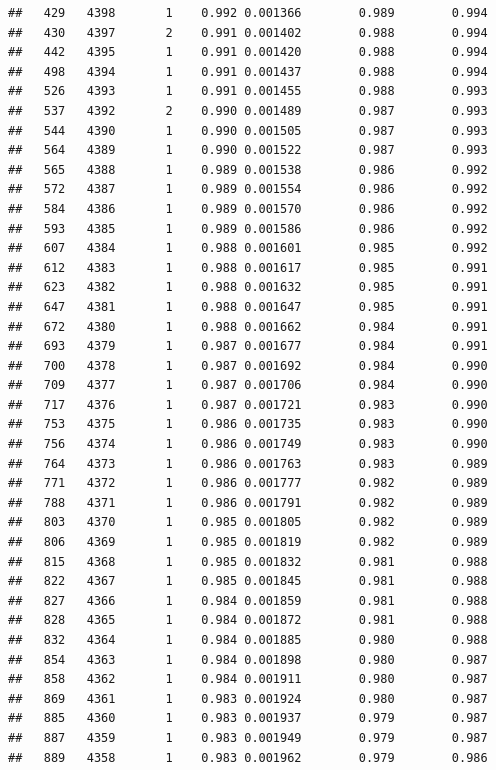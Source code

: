 \documentclass[
]{book}
\begin{document}
\begin{verbatim}
##   429   4398       1    0.992 0.001366        0.989        0.994
##   430   4397       2    0.991 0.001402        0.988        0.994
##   442   4395       1    0.991 0.001420        0.988        0.994
##   498   4394       1    0.991 0.001437        0.988        0.994
##   526   4393       1    0.991 0.001455        0.988        0.993
##   537   4392       2    0.990 0.001489        0.987        0.993
##   544   4390       1    0.990 0.001505        0.987        0.993
##   564   4389       1    0.990 0.001522        0.987        0.993
##   565   4388       1    0.989 0.001538        0.986        0.992
##   572   4387       1    0.989 0.001554        0.986        0.992
##   584   4386       1    0.989 0.001570        0.986        0.992
##   593   4385       1    0.989 0.001586        0.986        0.992
##   607   4384       1    0.988 0.001601        0.985        0.992
##   612   4383       1    0.988 0.001617        0.985        0.991
##   623   4382       1    0.988 0.001632        0.985        0.991
##   647   4381       1    0.988 0.001647        0.985        0.991
##   672   4380       1    0.988 0.001662        0.984        0.991
##   693   4379       1    0.987 0.001677        0.984        0.991
##   700   4378       1    0.987 0.001692        0.984        0.990
##   709   4377       1    0.987 0.001706        0.984        0.990
##   717   4376       1    0.987 0.001721        0.983        0.990
##   753   4375       1    0.986 0.001735        0.983        0.990
##   756   4374       1    0.986 0.001749        0.983        0.990
##   764   4373       1    0.986 0.001763        0.983        0.989
##   771   4372       1    0.986 0.001777        0.982        0.989
##   788   4371       1    0.986 0.001791        0.982        0.989
##   803   4370       1    0.985 0.001805        0.982        0.989
##   806   4369       1    0.985 0.001819        0.982        0.989
##   815   4368       1    0.985 0.001832        0.981        0.988
##   822   4367       1    0.985 0.001845        0.981        0.988
##   827   4366       1    0.984 0.001859        0.981        0.988
##   828   4365       1    0.984 0.001872        0.981        0.988
##   832   4364       1    0.984 0.001885        0.980        0.988
##   854   4363       1    0.984 0.001898        0.980        0.987
##   858   4362       1    0.984 0.001911        0.980        0.987
##   869   4361       1    0.983 0.001924        0.980        0.987
##   885   4360       1    0.983 0.001937        0.979        0.987
##   887   4359       1    0.983 0.001949        0.979        0.987
##   889   4358       1    0.983 0.001962        0.979        0.986

\end{verbatim}
\end{document}
